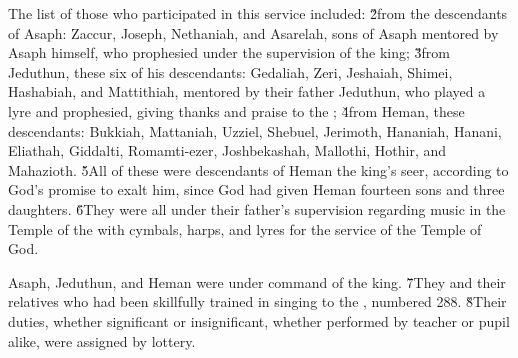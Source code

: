 The list of those who participated in this service included: \v{2}from the descendants of Asaph: Zaccur, Joseph, Nethaniah, and Asarelah, sons of Asaph mentored by Asaph himself, who prophesied under the supervision of the king; \v{3}from Jeduthun, these six of his descendants: Gedaliah, Zeri, Jeshaiah, Shimei, Hashabiah, and Mattithiah, mentored by their father Jeduthun, who played a lyre and prophesied, giving thanks and praise to the ; \v{4}from Heman, these descendants: Bukkiah, Mattaniah, Uzziel, Shebuel, Jerimoth, Hananiah, Hanani, Eliathah, Giddalti, Romamti-ezer, Joshbekashah, Mallothi, Hothir, and Mahazioth. \v{5}All of these were descendants of Heman the king's seer, according to God's promise to exalt him, since God had given Heman fourteen sons and three daughters. \v{6}They were all under their father's supervision regarding music in the Temple of the  with cymbals, harps, and lyres for the service of the Temple of God.

Asaph, Jeduthun, and Heman were under command of the king. \v{7}They and their relatives who had been skillfully trained in singing to the , numbered 288. \v{8}Their duties, whether significant or insignificant, whether performed by teacher or pupil alike, were assigned by lottery.

